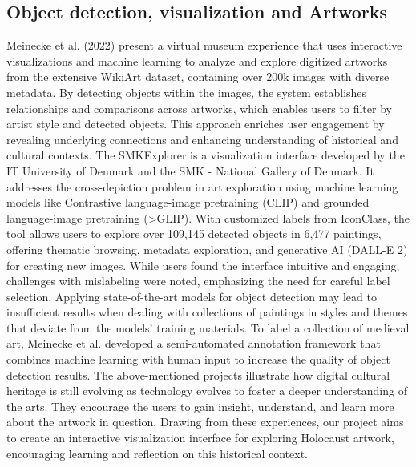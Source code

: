 \subsection{Object detection, visualization and Artworks}
Meinecke et al. (2022) \cite{meinecke2022}  present a virtual museum experience that uses interactive visualizations and machine learning to analyze and explore digitized artworks from the extensive WikiArt dataset, containing over 200k images with diverse metadata. By detecting objects within the images, the system establishes relationships and comparisons across artworks, which enables users to filter by artist style and detected objects. This approach enriches user engagement by revealing underlying connections and enhancing understanding of historical and cultural contexts.
The SMKExplorer \cite{meyer2024} is a visualization interface developed by the IT University of Denmark and the SMK - National Gallery of Denmark. It addresses the cross-depiction problem in art exploration using machine learning models like Contrastive language-image pretraining (CLIP) and grounded language-image pretraining (>GLIP). With customized labels from IconClass, the tool allows users to explore over 109,145 detected objects in 6,477 paintings, offering thematic browsing, metadata exploration, and generative AI (DALL-E 2) for creating new images. While users found the interface intuitive and engaging, challenges with mislabeling were noted, emphasizing the need for careful label selection.
Applying state-of-the-art models for object detection may lead to insufficient results when dealing with collections of paintings in styles and themes that deviate from the models’ training materials. To label a collection of medieval art, Meinecke et al. \cite{meinecke2024} developed a semi-automated annotation framework that combines machine learning with human input to increase the quality of object detection results.
The above-mentioned projects illustrate how digital cultural heritage is still evolving as technology evolves to foster a deeper understanding of the arts. They encourage the users to gain insight, understand, and learn more about the artwork in question. Drawing from these experiences, our project aims to create an interactive visualization interface for exploring Holocaust artwork, encouraging learning and reflection on this historical context.